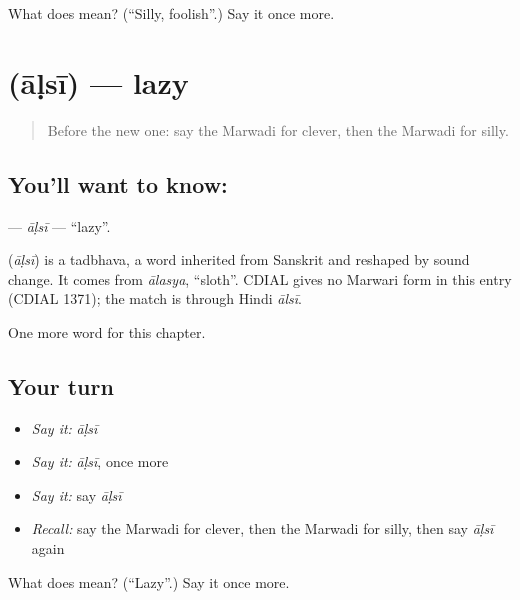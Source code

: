 \begin{tcolorbox}[breakable,colback=teal!4,colframe=teal!35!black,title={Before you move on}]
What does  mean? (\textquotedblleft{}Silly, foolish\textquotedblright{}.) Say it once more.
\end{tcolorbox}
\section[\texorpdfstring{\mw{आळसी} (āḷsī)}{आळसी (āḷsī)}]{ (āḷsī) — lazy}

\label{lesson:MW-C146-alsi}



\begin{quote}
Before the new one: say the Marwadi for clever, then the Marwadi for silly.
\end{quote}

\subsection*{You'll want to know: }
\textbf{} — \emph{āḷsī} — \textquotedblleft{}lazy\textquotedblright{}.

\begin{cousinweb}
\textbf{} (\emph{āḷsī}) is a tadbhava, a word inherited from Sanskrit and reshaped by sound change. It comes from \emph{ālasya}, \textquotedblleft{}sloth\textquotedblright{}. CDIAL gives no Marwari form in this entry (CDIAL 1371); the match is through Hindi \emph{ālsī}.
\end{cousinweb}

\begin{grammarlens}[title={What you've built}]
One more word for this chapter.
\end{grammarlens}

\subsection*{Your turn}
\begin{itemize}
\raggedright
  \item \emph{Say it:} \emph{āḷsī}
  \item \emph{Say it:} \emph{āḷsī}, once more
  \item \emph{Say it:} say \emph{āḷsī}
  \item \emph{Recall:} say the Marwadi for clever, then the Marwadi for silly, then say \emph{āḷsī} again
\end{itemize}

\begin{tcolorbox}[breakable,colback=teal!4,colframe=teal!35!black,title={Before you move on}]
What does  mean? (\textquotedblleft{}Lazy\textquotedblright{}.) Say it once more.
\end{tcolorbox}
